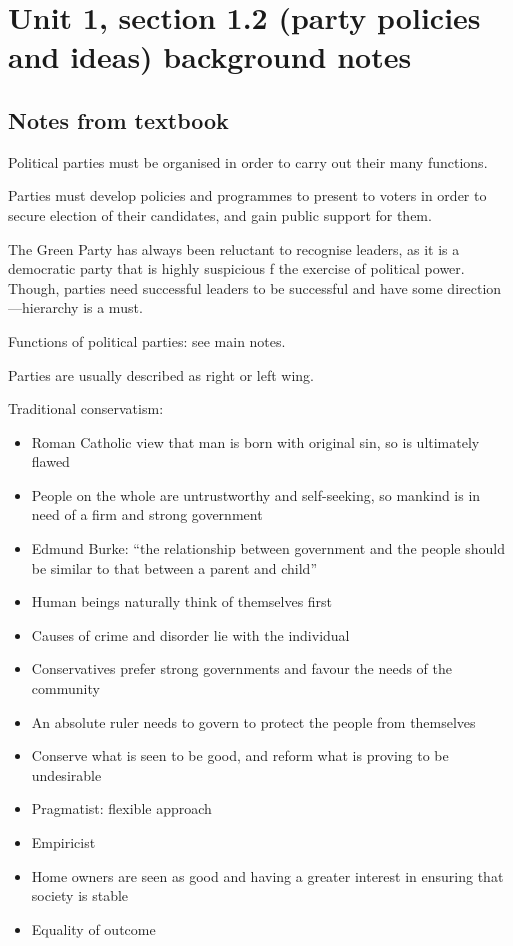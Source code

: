 \documentclass[12pt]{article}
\begin{document}
\section*{Unit 1, section 1.2 (party policies and ideas) background notes}

	\subsection*{Notes from textbook}

	Political parties must be organised in order to carry out their many functions.

	Parties must develop policies and programmes to present to voters in order to secure election of their candidates, and gain public support for them.

	The Green Party has always been reluctant to recognise leaders, as it is a democratic party that is highly suspicious f the exercise of political power.  Though, parties need successful leaders to be successful and have some direction---hierarchy is a must.

	Functions of political parties: see main notes.

	Parties are usually described as right or left wing.

	Traditional conservatism:

	\begin{itemize}	
		\item{Roman Catholic view that man is born with original sin, so is ultimately flawed}
		\item{People on the whole are untrustworthy and self-seeking, so mankind is in need of a firm and strong government}
		\item{Edmund Burke: ``the relationship between government and the people should be similar to that between a parent and child''}
		\item{Human beings naturally think of themselves first}
		\item{Causes of crime and disorder lie with the individual}
		\item{Conservatives prefer strong governments and favour the needs of the community}
		\item{An absolute ruler needs to govern to protect the people from themselves}
		\item{Conserve what is seen to be good, and reform what is proving to be undesirable}
		\item{Pragmatist: flexible approach}
		\item{Empiricist}
		\item{Home owners are seen as good and having a greater interest in ensuring that society is stable}
		\item{Equality of outcome}
	\end{itemize}
\end{document}
